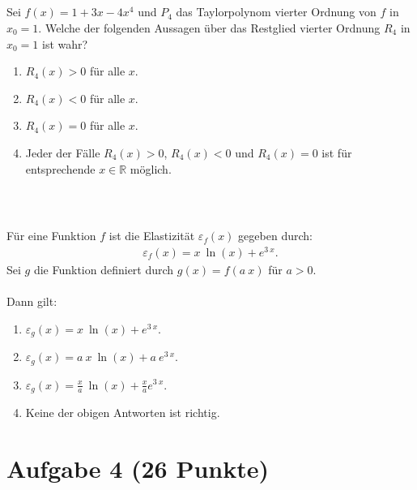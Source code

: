 \subsection*{}
Sei $ f(x) = 1 + 3  x- 4  x^4 $ und $ P_4 $ das Taylorpolynom vierter Ordnung von $ f  $ in $ x_0 = 1 $.
Welche der folgenden Aussagen über das Restglied vierter Ordnung $ R_4 $ in $ x_0 = 1 $ ist wahr?
\renewcommand{\labelenumi}{(\alph{enumi})}
\begin{enumerate}
\item 
$ R_4(x) > 0  $ für alle $ x $.
\item
$ R_4(x) <0  $ für alle $ x $.
\item
$ R_4(x) =0  $ für alle $ x $.
\item
Jeder der Fälle $ R_4(x ) > 0 $, $ R_4(x) < 0 $ und $ R_4(x) = 0 $ ist für entsprechende $ x \in \mathbb{R} $ möglich.
\end{enumerate}
\ \\
\subsection*{}
Für eine Funktion $ f $ ist die Elastizität $ \varepsilon_f(x) $ gegeben durch:
\begin{align*}
\varepsilon_f(x) =x \ \ln (x) + e^{3 \ x}.
\end{align*}
Sei $ g $ die Funktion definiert durch $ g(x) = f( a \ x) $ für $ a > 0 $.\\
\\
Dann gilt:
\renewcommand{\labelenumi}{(\alph{enumi})}
\begin{enumerate}
\item 
$ \varepsilon_g(x) = x \ \ln(x)  + e^{3 \ x}$.
\item
$ \varepsilon_g(x) =a \  x \ \ln(x)  +a \   e^{3 \ x} $.
\item
$ \varepsilon_g(x) =\frac{x}{a} \ \ln(x)  +\frac{x}{a}   e^{3 \ x} $.
\item
Keine der obigen Antworten ist richtig.
\end{enumerate}


\newpage
\section*{Aufgabe 4 (26 Punkte)}
\vspace{0.4cm}

